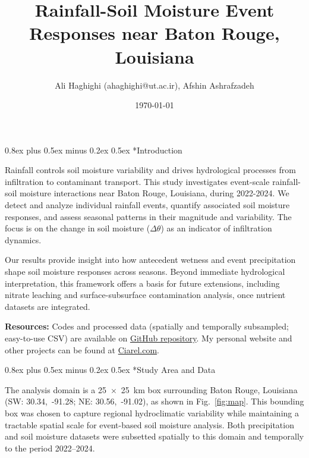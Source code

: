 \documentclass[twocolumn]{article}
\title{Rainfall-Soil Moisture Event Responses near Baton Rouge, Louisiana}
\author{%
  Ali Haghighi \footnotesize{(ahaghighi@ut.ac.ir)}\normalsize, Afshin Ashrafzadeh
}
\date{\today}
\makeatletter
\renewcommand\section{\@startsection{section}{1}{0pt}%
  {0.8ex plus 0.5ex minus 0.2ex}%
  {0.5ex}%
  {\normalfont\large\bfseries}}
\renewcommand{\maketitle}{\bgroup\setlength{\parindent}{0pt}
\begin{flushleft}
  \Large\textbf{\@title}

  \vspace{0.2cm}

  \normalsize\@author \hfill \normalsize\@date

  \vspace{0.25cm}\hrule\vspace{0.25cm}
\end{flushleft}
\egroup}
\makeatother
\begin{document}
\twocolumn[
  \begin{@twocolumnfalse}
    \maketitle
  \end{@twocolumnfalse}
]


\section*{Introduction}

Rainfall controls soil moisture variability and drives hydrological processes from infiltration to contaminant transport. This study investigates event-scale rainfall-soil moisture interactions near Baton Rouge, Louisiana, during 2022-2024. We detect and analyze individual rainfall events, quantify associated soil moisture responses, and assess seasonal patterns in their magnitude and variability. The focus is on the change in soil moisture ($\Delta \theta$) as an indicator of infiltration dynamics.

Our results provide insight into how antecedent wetness and event precipitation shape soil moisture responses across seasons. Beyond immediate hydrological interpretation, this framework offers a basis for future extensions, including nitrate leaching and surface-subsurface contamination analysis, once nutrient datasets are integrated.

\textbf{Resources: }
Codes and processed data (spatially and temporally subsampled; easy-to-use CSV) are available on \href{https://github.com/Alioax/rainfall-soil-moisture/}{GitHub repository}. 
My personal website and other projects can be found at \href{https://ciarel.com}{Ciarel.com}.


\section*{Study Area and Data}

The analysis domain is a 25~$\times$~25~km box surrounding Baton Rouge, Louisiana (SW: 30.34,~-91.28; NE: 30.56,~-91.02), as shown in Fig.~\ref{fig:map}. This bounding box was chosen to capture regional hydroclimatic variability while maintaining a tractable spatial scale for event-based soil moisture analysis. Both precipitation and soil moisture datasets were subsetted spatially to this domain and temporally to the period 2022--2024.
\end{document}
